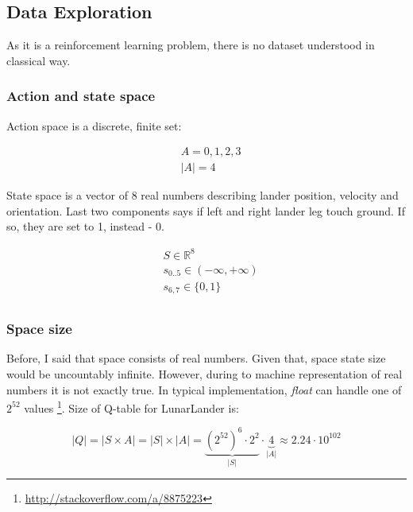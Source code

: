 \documentclass[12pt]{article}
\begin{document}
\subsection{Data Exploration}

As it is a reinforcement learning problem, there is no dataset understood in classical way.

\subsubsection{Action and state space}

Action space is a discrete, finite set:

\begin{equation}
\begin{aligned}
&A = {0,1,2,3} \\
&|A| = 4
\end{aligned}
\end{equation}

State space is a vector of 8 real numbers describing lander position, velocity and orientation. Last two components says if left and right lander leg touch ground. If so, they are set to 1, instead - 0.

\begin{equation}
\begin{aligned}
&S \in \mathbb{R}^8 \\
&s_{0..5} \in (-\infty, +\infty) \\
&s_{6,7} \in \{0,1\} \\
\end{aligned}
\end{equation}

\subsubsection{Space size}

Before, I said that space consists of real numbers. Given that, space state size  would be uncountably infinite. However, during to machine representation of real numbers it is not exactly true. In typical implementation, \emph{float} can handle one of $2^{52}$ values \footnote{\url{http://stackoverflow.com/a/8875223}}. Size of Q-table for LunarLander is:

\begin{equation}
|Q| = |S \times A| = |S| \times |A| = \underbrace{{(2^{52})}^6 \cdot 2^2}_{|S|} \cdot \underbrace{4}_{|A|} \approx 2.24 \cdot 10^{102}
\end{equation}
\end{document}
